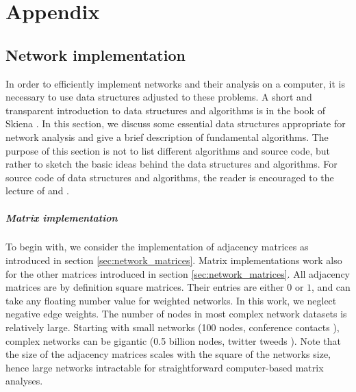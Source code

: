 %
%
%
%
%
%
%

\chapter{Appendix}

\section{Network implementation}\label{sec:implementation}
In order to efficiently implement networks and their analysis on a computer, it is necessary to use data structures adjusted to these problems.
A short and transparent introduction to data structures and algorithms is in the book of Skiena \citep{algorithm_design}.
In this section, we discuss some essential data structures appropriate for network analysis and give a brief description of fundamental algorithms.
The purpose of this section is not to list different algorithms and source code, but rather to sketch the basic ideas behind the data structures and algorithms.
For source code of data structures and algorithms, the reader is encouraged to the lecture of \citep{algorithm_design} and \citep{Merali:2010ih}.

\paragraph{Matrix implementation\color{Cayenne}{.}}
To begin with, we consider the implementation of adjacency matrices as introduced in section \ref{sec:network_matrices}.
Matrix implementations work also for the other matrices introduced in section \ref{sec:network_matrices}.
All adjacency matrices are by definition square matrices.
Their entries are either $0$ or $1$, and can take any floating number value for weighted networks.
In this work, we neglect negative edge weights.
The number of nodes in most complex network datasets is relatively large. 
Starting with small networks (100 nodes, conference contacts \citep{isella2011}), complex networks can be gigantic (0.5 billion nodes, twitter tweeds \citep{Yang:2011}).
Note that the size of the adjacency matrices scales with the square of the networks size, hence large networks intractable for straightforward computer-based matrix analyses.

